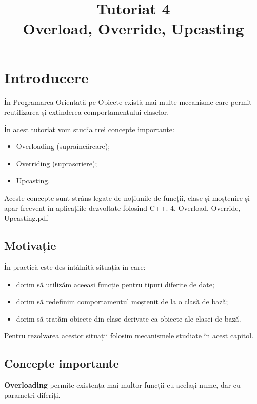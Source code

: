 \documentclass[12pt,a4paper]{article}
\title{Tutoriat 4\\Overload, Override, Upcasting}
\author{}
\date{}
\begin{document}
\maketitle





\section{Introducere}

În Programarea Orientată pe Obiecte există mai multe mecanisme care permit reutilizarea și extinderea comportamentului claselor.

În acest tutoriat vom studia trei concepte importante:

\begin{itemize}
\item Overloading (supraîncărcare);
\item Overriding (suprascriere);
\item Upcasting.
\end{itemize}

Aceste concepte sunt strâns legate de noțiunile de funcții, clase și moștenire și apar frecvent în aplicațiile dezvoltate folosind C++. 4. Overload, Override, Upcasting.pdf

\subsection{Motivație}

În practică este des întâlnită situația în care:

\begin{itemize}
\item dorim să utilizăm aceeași funcție pentru tipuri diferite de date;
\item dorim să redefinim comportamentul moștenit de la o clasă de bază;
\item dorim să tratăm obiecte din clase derivate ca obiecte ale clasei de bază.
\end{itemize}

Pentru rezolvarea acestor situații folosim mecanismele studiate în acest capitol.

\subsection{Concepte importante}

\textbf{Overloading} permite existența mai multor funcții cu același nume, dar cu parametri diferiți.
\end{document}

